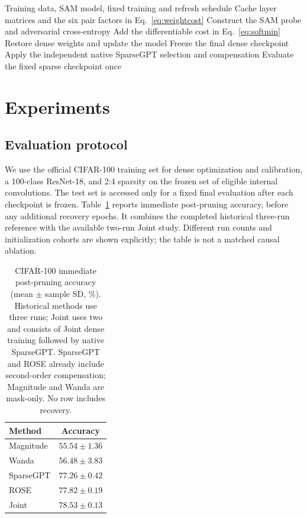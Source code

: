 \documentclass[10pt,a4paper]{article}
\begin{document}
\begin{algorithm}[H]
\caption{Dense training with a pairwise pruning proxy}
\begin{algorithmic}[1]
\Require Training data, SAM model, fixed training and refresh schedule
    \State Cache layer matrices and the six pair factors in Eq.~\eqref{eq:weightcost}
  \EndIf
    \State Construct the SAM probe and adversarial cross-entropy
      \State Add the differentiable cost in Eq.~\eqref{eq:softmin}
    \EndIf
    \State Restore dense weights and update the model
  \EndFor
\EndFor
\State Freeze the final dense checkpoint
\State Apply the independent native SparseGPT selection and compensation
\State Evaluate the fixed sparse checkpoint once
\end{algorithmic}
\end{algorithm}

\section{Experiments}
\subsection{Evaluation protocol}
We use the official CIFAR-100 training set for dense optimization and calibration, a 100-class ResNet-18, and 2:4 sparsity on the frozen set of eligible internal convolutions. The test set is accessed only for a fixed final evaluation after each checkpoint is frozen. Table~\ref{tab:main} reports immediate post-pruning accuracy, before any additional recovery epochs. It combines the completed historical three-run reference with the available two-run Joint study. Different run counts and initialization cohorts are shown explicitly; the table is not a matched causal ablation.

\begin{table}[H]
\centering\small
\caption{CIFAR-100 immediate post-pruning accuracy (mean $\pm$ sample SD, \%). Historical methods use three runs; Joint uses two and consists of Joint dense training followed by native SparseGPT. SparseGPT and ROSE already include second-order compensation; Magnitude and Wanda are mask-only. No row includes recovery.}
\label{tab:main}
\begin{tabular}{lc}
\toprule
Method & Accuracy \\
\midrule
Magnitude & $55.54\pm 1.36$ \\
Wanda & $56.48\pm 3.83$ \\
SparseGPT & $77.26\pm 0.42$ \\
ROSE & $77.82\pm 0.19$ \\
Joint & $78.53\pm 0.13$ \\
\bottomrule
\end{tabular}
\end{table}
\end{document}
